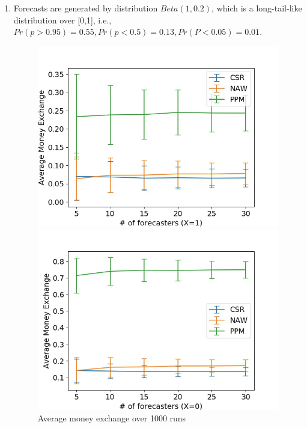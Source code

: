 \documentclass[english,10pt]{article}
\begin{document}
\begin{enumerate}
	\newpage
	\item Forecasts are generated by distribution $Beta(1, 0.2)$, which is a long-tail-like distribution over [0,1], i.e., $Pr(p>0.95)=0.55, Pr(p<0.5)=0.13, Pr(P<0.05)=0.01$.
	\begin{figure}[H]
        	\centering
        	\begin{minipage}{0.48\textwidth}
        \includegraphics[width = \textwidth]{MnEx(Beta(1_0dot2)F_UnifW)Avg_MnEx(X=1).jpg}
        	\end{minipage}
        	\begin{minipage}{0.48\textwidth}
        \includegraphics[width = \textwidth]{MnEx(Beta(1_0dot2)F_UnifW)Avg_MnEx(X=0).jpg}
        	\end{minipage}
        	\caption{Average money exchange over 1000 runs}
        	\end{figure}
        	

\end{enumerate}
\end{document}
